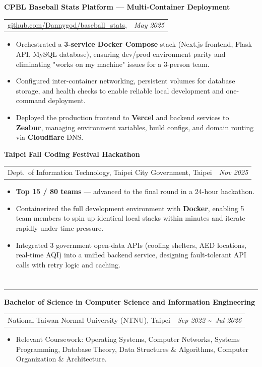 \documentclass{article}
\makeatletter
\newcommand{\TitleShadow}[1]{
  \hspace{-0.4cm}
  \shadowtext{\fontsize{16pt}{22pt}\selectfont {\StrLeft{#1}{1}}}%
  \shadowtext{\fontsize{12pt}{18pt}\selectfont \hspace{-0.5em}\StrGobbleLeft{#1}{1}}%
}
\newenvironment{education}[4]{
    \noindent
    \large \textbf{#1} \\ [0.1cm]
    \normalsize 
    \begin{tabular}{@{}l@{\hspace{0.5cm}}l@{}}
      #2, #3 & \textcolor{customblue}{\textit{\textsf{#4}}} 
    \end{tabular} 
    \vspace{-0.2cm}
    \fontsize{9pt}{12pt}\selectfont
    \begin{itemize}[leftmargin=0.6cm, labelsep=0.3cm, itemsep=-0.08cm] 
}{
    \end{itemize}
}
\newenvironment{sideproject}[4]{
    \noindent
    \large \textbf{#1} \\ [0.1cm]
    \normalsize 
    \begin{tabular}{@{}l@{\hspace{0.5cm}}l@{}}
      #2, #3 & \textcolor{customblue}{\textit{\textsf{#4}}} 
    \end{tabular} 
    \vspace{-0.2cm}
    \fontsize{9pt}{12pt}\selectfont
    \begin{itemize}[leftmargin=0.6cm, labelsep=0.3cm, itemsep=-0.08cm] 
}{
    \end{itemize}
}
\makeatother
\begin{document}
\begin{sideproject}{CPBL Baseball Stats Platform — Multi-Container Deployment}{\href{https://github.com/Dannygod/baseball\_stats}{github.com/Dannygod/baseball\_stats}}{}{May 2025}
    \item Orchestrated a \textbf{3-service Docker Compose} stack (Next.js frontend, Flask API, MySQL database), ensuring dev/prod environment parity and eliminating "works on my machine" issues for a 3-person team.
    \item Configured inter-container networking, persistent volumes for database storage, and health checks to enable reliable local development and one-command deployment.
    \item Deployed the production frontend to \textbf{Vercel} and backend services to \textbf{Zeabur}, managing environment variables, build configs, and domain routing via \textbf{Cloudflare} DNS.
\end{sideproject}

\vspace{0.15cm}

\begin{sideproject}{Taipei Fall Coding Festival Hackathon}{Dept.\ of Information Technology, Taipei City Government}{Taipei}{Nov 2025}
    \item \textbf{Top 15 / 80 teams} — advanced to the final round in a 24-hour hackathon.
    \item Containerized the full development environment with \textbf{Docker}, enabling 5 team members to spin up identical local stacks within minutes and iterate rapidly under time pressure.
    \item Integrated 3 government open-data APIs (cooling shelters, AED locations, real-time AQI) into a unified backend service, designing fault-tolerant API calls with retry logic and caching.
\end{sideproject}

\vspace{-0.5cm}

\section*{\TitleShadow{EDUCATION}}
\vspace{-0.5cm}
\noindent\rule{\textwidth}{0.4pt} 
\vspace{-0.25cm}

\begin{education}{Bachelor of Science in Computer Science and Information Engineering}{National Taiwan Normal University (NTNU)}{Taipei}{Sep 2022 \textasciitilde\ Jul 2026}
    \item Relevant Coursework: Operating Systems, Computer Networks, Systems Programming, Database Theory, Data Structures \& Algorithms, Computer Organization \& Architecture.
\end{education}
\vspace{-0.6cm}
\end{document}
